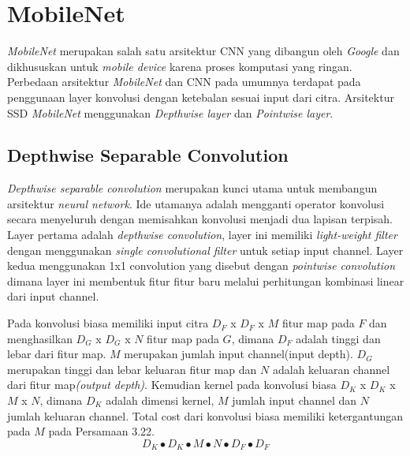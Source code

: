 \section{MobileNet}
\emph{MobileNet} merupakan salah satu arsitektur CNN yang dibangun oleh \emph{Google} dan dikhususkan untuk \emph{mobile device} karena proses komputasi yang ringan. Perbedaan arsitektur \emph{MobileNet} dan CNN pada umumnya terdapat pada penggunaan layer konvolusi dengan ketebalan sesuai input dari citra. Arsitektur SSD \emph{MobileNet} menggunakan \emph{Depthwise layer} dan \emph{Pointwise layer}.
\subsection{Depthwise Separable Convolution}
\emph{Depthwise separable convolution} merupakan kunci utama untuk membangun arsitektur \emph{neural network}. Ide utamanya adalah mengganti operator konvolusi secara menyeluruh dengan memisahkan konvolusi menjadi dua lapisan terpisah. Layer pertama adalah \emph{depthwise convolution}, layer ini memiliki \emph{light-weight filter} dengan menggunakan \emph{single convolutional filter} untuk setiap input channel. Layer kedua menggunakan 1x1 convolution yang disebut dengan \emph{pointwise convolution} dimana layer ini membentuk fitur fitur baru melalui perhitungan kombinasi linear dari input channel. 

Pada konvolusi biasa memiliki input citra $D_F$ x $D_F$ x $M $ fitur map pada $F$ dan menghasilkan $ D_G$ x $D_G$ x $N $ fitur map pada $G$, dimana $D_F$ adalah tinggi dan lebar dari fitur map. $M$ merupakan jumlah input channel(input depth). 
$D_G$ merupakan tinggi dan lebar keluaran fitur map dan $N$ adalah keluaran channel dari fitur map\emph{(output depth)}. Kemudian kernel pada konvolusi biasa $D_K$ x $D_K$ x $M$ x $N$, dimana $D_K$ adalah dimensi kernel, $M$ jumlah input channel dan $N$ jumlah keluaran channel. Total cost dari konvolusi biasa memiliki ketergantungan pada $M$ pada Persamaan 3.22.
\begin{equation}
	D_K \bullet D_K \bullet M \bullet N \bullet D_F \bullet D_F
\end{equation}

